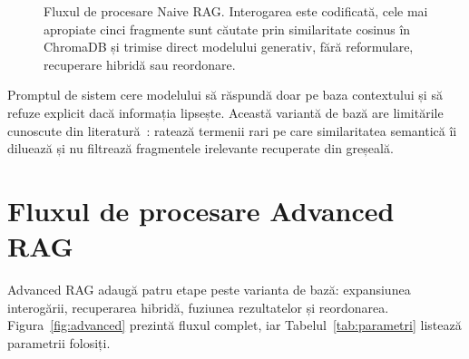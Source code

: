 \begin{figure}[ht]
\centering
{}
\caption{Fluxul de procesare Naive RAG. Interogarea este codificată, cele mai apropiate cinci fragmente sunt căutate prin similaritate cosinus în ChromaDB și trimise direct modelului generativ, fără reformulare, recuperare hibridă sau reordonare.}
\label{fig:naive}
\end{figure}

Promptul de sistem cere modelului să răspundă doar pe baza contextului și să refuze explicit dacă informația lipsește. Această variantă de bază are limitările cunoscute din literatură~\cite{gao2024retrievalaugmentedgenerationlargelanguage}: ratează termenii rari pe care similaritatea semantică îi diluează și nu filtrează fragmentele irelevante recuperate din greșeală.

\section{Fluxul de procesare Advanced RAG}

Advanced RAG adaugă patru etape peste varianta de bază: expansiunea interogării, recuperarea hibridă, fuziunea rezultatelor și reordonarea. Figura~\ref{fig:advanced} prezintă fluxul complet, iar Tabelul~\ref{tab:parametri} listează parametrii folosiți.

